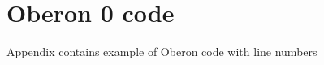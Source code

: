 \documentclass[english,preprint,12pt]{elsarticle}
\begin{document}
\section{Oberon 0 code}
\label{sec:samples}
Appendix contains example of Oberon code with line numbers






%








\end{document}

